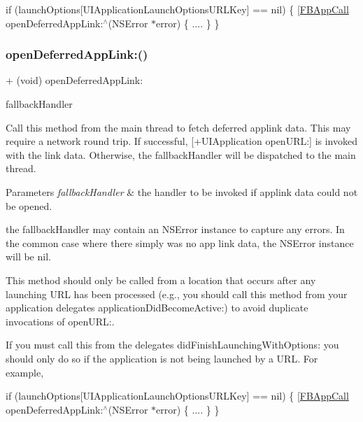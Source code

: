 if (launch\+Options\mbox{[}U\+I\+Application\+Launch\+Options\+U\+R\+L\+Key\mbox{]} == nil) \{ \mbox{[}\hyperlink{interfaceFBAppCall}{F\+B\+App\+Call} open\+Deferred\+App\+Link\+:$^\wedge$(N\+S\+Error $\ast$error) \{ .... \} \} \mbox{\label{interfaceFBAppCall_a02498c71e0be169b1ae49136d1446a23}} 
\subsubsection{\texorpdfstring{open\+Deferred\+App\+Link\+:()}{openDeferredAppLink:()}\hspace{0.1cm}{\footnotesize\ttfamily [5/5]}}
{\footnotesize\ttfamily + (void) open\+Deferred\+App\+Link\+: \begin{DoxyParamCaption}\item[{(F\+B\+App\+Link\+Fallback\+Handler)}]{fallback\+Handler }\end{DoxyParamCaption}}

Call this method from the main thread to fetch deferred applink data. This may require a network round trip. If successful, \mbox{[}+\+U\+I\+Application open\+U\+RL\+:\mbox{]} is invoked with the link data. Otherwise, the fallback\+Handler will be dispatched to the main thread.


\begin{DoxyParams}{Parameters}
{\em fallback\+Handler} & the handler to be invoked if applink data could not be opened.\\
\hline
\end{DoxyParams}
the fallback\+Handler may contain an N\+S\+Error instance to capture any errors. In the common case where there simply was no app link data, the N\+S\+Error instance will be nil.

This method should only be called from a location that occurs after any launching U\+RL has been processed (e.\+g., you should call this method from your application delegate\textquotesingle{}s application\+Did\+Become\+Active\+:) to avoid duplicate invocations of open\+U\+RL\+:.

If you must call this from the delegate\textquotesingle{}s did\+Finish\+Launching\+With\+Options\+: you should only do so if the application is not being launched by a U\+RL. For example,

if (launch\+Options\mbox{[}U\+I\+Application\+Launch\+Options\+U\+R\+L\+Key\mbox{]} == nil) \{ \mbox{[}\hyperlink{interfaceFBAppCall}{F\+B\+App\+Call} open\+Deferred\+App\+Link\+:$^\wedge$(N\+S\+Error $\ast$error) \{ .... \} \} 

